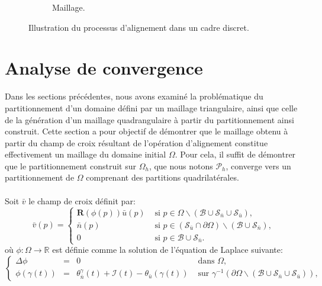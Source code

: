 \begin{figure}[h!]
\begin{subfigure}{0.482\textwidth}
    \caption{Maillage.}
    \label{fig:alignment_4}
\end{subfigure}
\caption{Illustration du processus d'alignement dans un cadre discret.}
\label{fig:alignment}
\end{figure}


\section{Analyse de convergence}
\label{subsec:analyse_convergence}

Dans les sections précédentes, nous avons examiné la problématique du partitionnement d'un domaine défini par un maillage triangulaire, ainsi que celle de la génération d'un maillage quadrangulaire à partir du partitionnement ainsi construit. Cette section a pour objectif de démontrer que le maillage obtenu à partir du champ de croix résultant de l'opération d'alignement constitue effectivement un maillage du domaine initial $\Omega$. Pour cela, il suffit de démontrer que le partitionnement construit sur $\Omega_h$, que nous notons $\mathcal{P}_h$, converge vers un partitionnement de $\Omega$ comprenant des partitions quadrilatérales.\\\\
Soit $\bar{v}$ le champ de croix définit par:
\begin{equation}
\bar{v}(p)=
\left\{
\begin{array}{ll}
\mathbf{R}(\phi(p))\bar{u}(p) & \mbox{ si } p\in\Omega\backslash(\mathcal{B}\cup\mathcal{S}_{\bar{n}}\cup\mathcal{S}_{\bar{u}}),\\[0.5cm]
\bar{n}(p) & \mbox{ si } p\in(\mathcal{S}_{\bar{u}}\cap\partial\Omega)\backslash(\mathcal{B}\cup\mathcal{S}_{\bar{n}}),\\[0.5cm]
0 & \mbox{ si } p\in\mathcal{B}\cup\mathcal{S}_{\bar{n}}.
\end{array}
\right.
\label{eqn:continuous_def_v}
\end{equation}
où $\phi:\Omega\longrightarrow\mathbb{R}$ est définie comme la solution de l'équation de Laplace suivante:
\begin{equation}
\left\{
\begin{array}{lcll}
\Delta\phi &=& 0 &\mbox{ dans }\Omega,\\[0.5cm]
\phi(\gamma(t))&=&\theta_{\bar{n}}^\gamma(t)+\mathcal{I}(t)-\theta_{\bar{u}}(\gamma(t))& \mbox{ sur } \gamma^{-1}(\partial\Omega\backslash(\mathcal{B}\cup\mathcal{S}_{\bar{n}}\cup\mathcal{S}_{\bar{u}})),
\end{array}
\right.
\label{eqn:continuous_def_phi}
\end{equation}
